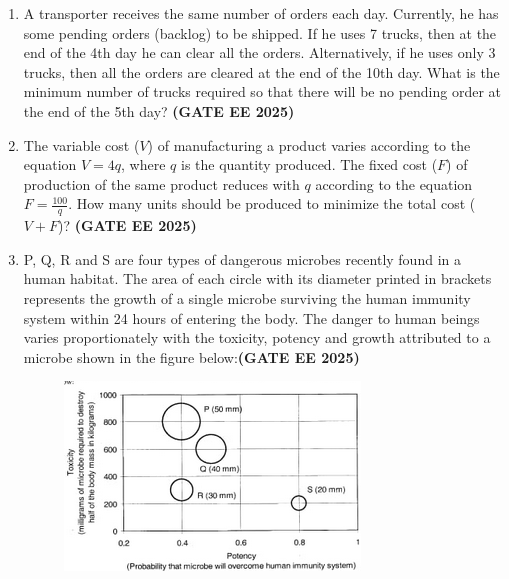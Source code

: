 \documentclass[journal,12pt,onecolumn]{IEEEtran}
\theoremstyle{remark}
\begin{document}
{\begin{enumerate}
\item  A transporter receives the same number of orders each day. Currently, he has some pending orders (backlog) to be shipped. If he uses 7 trucks, then at the end of the 4th day he can clear all the orders. Alternatively, if he uses only 3 trucks, then all the orders are cleared at the end of the 10th day. What is the minimum number of trucks required so that there will be no pending order at the end of the 5th day? \hfill \textbf{(GATE EE 2025)}  
\begin{enumerate}
\end{enumerate}

\item  The variable cost ($V$) of manufacturing a product varies according to the equation $V = 4q$, where $q$ is the quantity produced. The fixed cost ($F$) of production of the same product reduces with $q$ according to the equation $F = \frac{100}{q}$. How many units should be produced to minimize the total cost ($V+F$)? \hfill \textbf{(GATE EE 2025)}  
\begin{enumerate}
\end{enumerate}

\item  P, Q, R and S are four types of dangerous microbes recently found in a human habitat. The area of each circle with its diameter printed in brackets represents the growth of a single microbe surviving the human immunity system within 24 hours of entering the body. The danger to human beings varies proportionately with the toxicity, potency and growth attributed to a microbe shown in the figure below:\hfill \textbf{(GATE EE 2025)}
\begin{figure}[h]
    \centering
    \includegraphics[width=0.5\linewidth]{figs/fig5.png}
    \caption{}
    \label{fig5}
\end{figure}



\end{enumerate}}
\end{document}
